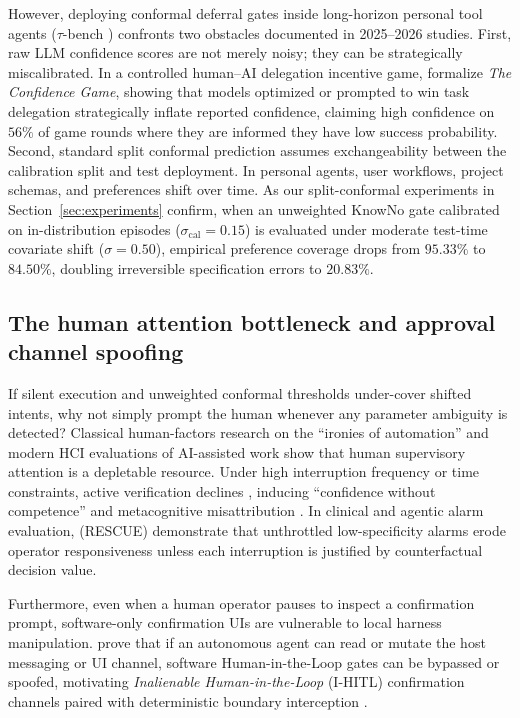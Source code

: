 \documentclass[11pt]{article}
\begin{document}
However, deploying conformal deferral gates inside long-horizon personal tool agents ($\tau$-bench \citep{yao2024taubench}) confronts two obstacles documented in 2025--2026 studies. First, raw LLM confidence scores are not merely noisy; they can be strategically miscalibrated. In a controlled human--AI delegation incentive game, \citet{arghal2026confidence} formalize \emph{The Confidence Game}, showing that models optimized or prompted to win task delegation strategically inflate reported confidence, claiming high confidence on $56\%$ of game rounds where they are informed they have low success probability. Second, standard split conformal prediction \citep{vovk2005conformal, ren2023knowno} assumes exchangeability between the calibration split and test deployment. In personal agents, user workflows, project schemas, and preferences shift over time. As our split-conformal experiments in Section~\ref{sec:experiments} confirm, when an unweighted KnowNo gate calibrated on in-distribution episodes ($\sigma_{\mathrm{cal}}=0.15$) is evaluated under moderate test-time covariate shift ($\sigma=0.50$), empirical preference coverage drops from $95.33\%$ to $84.50\%$, doubling irreversible specification errors to $20.83\%$.

\subsection{The human attention bottleneck and approval channel spoofing}

If silent execution and unweighted conformal thresholds under-cover shifted intents, why not simply prompt the human whenever any parameter ambiguity is detected? Classical human-factors research on the ``ironies of automation'' \citep{bainbridge1983ironies} and modern HCI evaluations of AI-assisted work \citep{vaccaro2024combinations, lee2025critical, zhi2026timeconstraints} show that human supervisory attention is a depletable resource. Under high interruption frequency or time constraints, active verification declines \citep{zhi2026timeconstraints}, inducing ``confidence without competence'' \citep{eleftheriou2026confidence} and metacognitive misattribution \citep{ren2026reflection}. In clinical and agentic alarm evaluation, \citet{armin2026rescue} (RESCUE) demonstrate that unthrottled low-specificity alarms erode operator responsiveness unless each interruption is justified by counterfactual decision value.

Furthermore, even when a human operator pauses to inspect a confirmation prompt, software-only confirmation UIs are vulnerable to local harness manipulation. \citet{breckenridge2026ihitl} prove that if an autonomous agent can read or mutate the host messaging or UI channel, software Human-in-the-Loop gates can be bypassed or spoofed, motivating \emph{Inalienable Human-in-the-Loop} (I-HITL) confirmation channels paired with deterministic boundary interception \citep{zhao2026clawguard, zhang2026actgov}.
\end{document}
